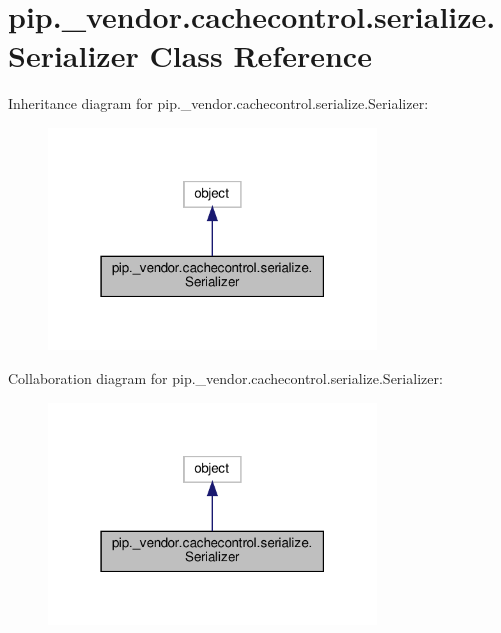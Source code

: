 \hypertarget{classpip_1_1__vendor_1_1cachecontrol_1_1serialize_1_1Serializer}{}\section{pip.\+\_\+vendor.\+cachecontrol.\+serialize.\+Serializer Class Reference}
\label{classpip_1_1__vendor_1_1cachecontrol_1_1serialize_1_1Serializer}


Inheritance diagram for pip.\+\_\+vendor.\+cachecontrol.\+serialize.\+Serializer\+:
\nopagebreak
\begin{figure}[H]
\begin{center}
\leavevmode
\includegraphics[width=247pt]{classpip_1_1__vendor_1_1cachecontrol_1_1serialize_1_1Serializer__inherit__graph}
\end{center}
\end{figure}


Collaboration diagram for pip.\+\_\+vendor.\+cachecontrol.\+serialize.\+Serializer\+:
\nopagebreak
\begin{figure}[H]
\begin{center}
\leavevmode
\includegraphics[width=247pt]{classpip_1_1__vendor_1_1cachecontrol_1_1serialize_1_1Serializer__coll__graph}
\end{center}
\end{figure}
